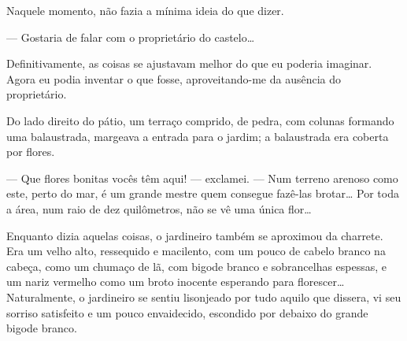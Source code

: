 
Naquele momento, não fazia a mínima ideia do que dizer.

--- Gostaria de falar com o proprietário do castelo\ldots{}



Definitivamente, as coisas se ajustavam melhor do que eu poderia
imaginar. Agora eu podia inventar o que fosse, aproveitando-me da
ausência do proprietário.



Do lado direito do pátio, um terraço comprido, de pedra, com colunas
formando uma balaustrada, margeava a entrada para o jardim; a
balaustrada era coberta por flores.

--- Que flores bonitas vocês têm aqui! --- exclamei. --- Num terreno
arenoso como este, perto do mar, é um grande mestre quem consegue
fazê-las brotar\ldots{} Por toda a área, num raio de dez quilômetros,
não se vê uma única flor\ldots{}

Enquanto dizia aquelas coisas, o jardineiro também se aproximou da
charrete. Era um velho alto, ressequido e macilento, com um pouco de
cabelo branco na cabeça, como um chumaço de lã, com bigode branco e
sobrancelhas espessas, e um nariz vermelho como um broto inocente
esperando para florescer\ldots{} Naturalmente, o jardineiro se sentiu
lisonjeado por tudo aquilo que dissera, vi seu sorriso satisfeito e um
pouco envaidecido, escondido por debaixo do grande bigode branco.


